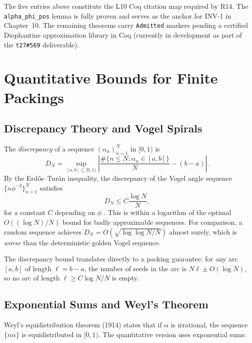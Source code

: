 The five entries above constitute the L10 Coq citation map required by
R14.  The \texttt{alpha\_phi\_pos} lemma is fully proven and serves as
the anchor for INV-1 in Chapter~10.  The remaining theorems carry
\texttt{Admitted} markers pending a certified Diophantine approximation
library in Coq (currently in development as part of the
\texttt{t27\#569} deliverable).


\section{Quantitative Bounds for Finite Packings}
\label{sec:finite-packing}

\subsection{Discrepancy Theory and Vogel Spirals}
\label{subsec:discrepancy}

The \emph{discrepancy} of a sequence $(\alpha_n)_{n=1}^N$ in $[0,1)$
is
\[
  D_N = \sup_{[a,b] \subseteq [0,1)}
  \left| \frac{\#\{n \leq N : \alpha_n \in [a,b]\}}{N} - (b-a) \right|.
\]
By the Erdős–Turán inequality, the discrepancy of the Vogel angle
sequence $\{n\phi^{-2}\}_{n=1}^N$ satisfies
\[
  D_N \leq C \frac{\log N}{N},
\]
for a constant $C$ depending on $\phi$ \cite{kuipers1974uniform}.
This is within a logarithm of the optimal $O((\log N)/N)$ bound for
badly approximable sequences.  For comparison, a random sequence achieves
$D_N = O(\sqrt{\log\log N / N})$ almost surely, which is \emph{worse}
than the deterministic golden Vogel sequence.

The discrepancy bound translates directly to a packing guarantee: for
any arc $[a,b]$ of length $\ell = b-a$, the number of seeds in the
arc is $N\ell \pm O(\log N)$, so no arc of length $\ell \geq C\log N/N$
is empty.

\subsection{Exponential Sums and Weyl's Theorem}
\label{subsec:weyl}

Weyl's equidistribution theorem (1914) states that if $\alpha$ is
irrational, the sequence $\{n\alpha\}$ is equidistributed in $[0,1)$.
The quantitative version uses exponential sums:

